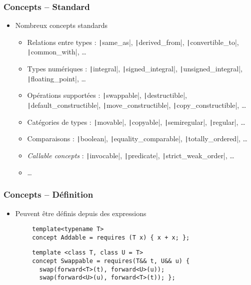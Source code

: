 \documentclass[C++.tex]{subfiles}
\begin{document}
\begin{frame}[fragile]
	\frametitle{Concepts -- Standard}
	\begin{itemize}
		\item Nombreux concepts standards
		\begin{itemize}
			\item Relations entre types : \texttt|same_as|, \texttt|derived_from|, \texttt|convertible_to|, \texttt|common_with|, \ldots{}
			\item Types numériques : \texttt|integral|, \texttt|signed_integral|, \texttt|unsigned_integral|, \texttt|floating_point|, \ldots{}
			\item Opérations supportées : \texttt|swappable|, \texttt|destructible|, \texttt|default_constructible|, \texttt|move_constructible|, \texttt|copy_constructible|, \ldots{}
			\item Catégories de types : \texttt|movable|, \texttt|copyable|, \texttt|semiregular|, \texttt|regular|, \ldots{}


			\item Comparaisons : \texttt|boolean|, \texttt|equality_comparable|, \texttt|totally_ordered|, \ldots{}
			\item \textit{Callable concepts} : \texttt|invocable|, \texttt|predicate|, \texttt|strict_weak_order|, \ldots{}
			\item \ldots{}
		\end{itemize}
	\end{itemize}
\end{frame}

\begin{frame}[fragile]
	\frametitle{Concepts -- Définition}
	\begin{itemize}
		\item Peuvent être définis depuis des expressions
	\end{itemize}

	\begin{verbatim}
		template<typename T>
		concept Addable = requires (T x) { x + x; };
	\end{verbatim}

	\begin{verbatim}
		template <class T, class U = T>
		concept Swappable = requires(T&& t, U&& u) {
		  swap(forward<T>(t), forward<U>(u));
		  swap(forward<U>(u), forward<T>(t)); };
	\end{verbatim}
\end{frame}
\end{document}

